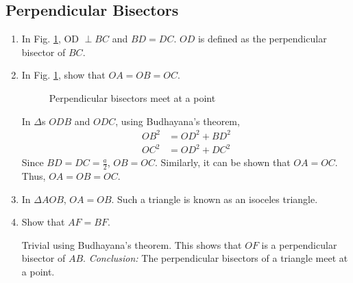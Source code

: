 \subsection{Perpendicular Bisectors}
\renewcommand{\theequation}{\theenumi}
\begin{enumerate}[label=\arabic*.,ref=\thesubsection.\theenumi]

\item
	In Fig. \ref{ch3_perp_bisector}, OD $\perp BC$ and $BD=DC$. $OD$ is defined as the perpendicular bisector of $BC$.


\item
	In Fig. \ref{ch3_perp_bisector}, show that $OA=OB=OC$.

\begin{figure}[!ht]
	\begin{center}
		
		\resizebox{\columnwidth}{!}{}
	\end{center}
	\caption{Perpendicular bisectors meet at a point}
	\label{ch3_perp_bisector}	
\end{figure}
%
\solution In $\Delta$s $ODB$ and $ODC$, using Budhayana's theorem,
%
\begin{equation}
\begin{split}
OB^2 &= OD^2 + BD^2 \\
OC^2 &= OD^2 + DC^2 
\end{split}
\end{equation}
%
Since $BD = DC = \frac{a}{2}$, $OB = OC$.  Similarly, it can be shown that $OA = OC$.  Thus, $OA=OB=OC$.
%
\item
	In $\Delta AOB$, $OA = OB$.  Such a triangle is known as an isoceles triangle.

%
\item
	Show that $AF = BF$.

\solution Trivial using Budhayana's theorem.  This shows that $OF$ is a perpendicular bisector of $AB$. 
{\em Conclusion:}  The perpendicular bisectors of a triangle meet at a point.
%
\end{enumerate}

